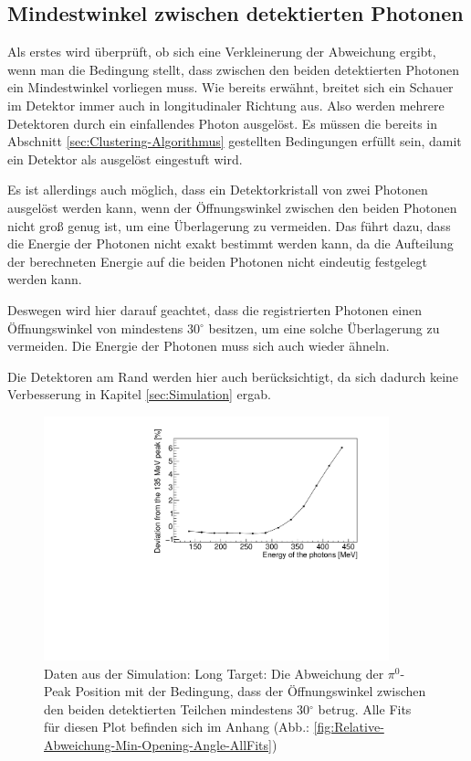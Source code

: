 \documentclass[a4paper,11pt,oneside,final,german,openbib,pdftex]{scrbook}
\begin{document}
{\subsection{Mindestwinkel zwischen detektierten Photonen}
\label{sec:Min-Openingangle}

Als erstes wird \"uberpr\"uft, ob sich eine Verkleinerung der Abweichung ergibt, wenn man die Bedingung stellt, dass zwischen den beiden detektierten Photonen ein Mindestwinkel vorliegen muss. 
Wie bereits erw\"ahnt, breitet sich ein Schauer im Detektor immer auch in longitudinaler Richtung aus. Also werden mehrere Detektoren durch ein einfallendes Photon ausgel\"ost. 
Es m\"ussen die bereits in Abschnitt \ref{sec:Clustering-Algorithmus} gestellten Bedingungen erf\"ullt sein, damit ein Detektor als ausgel\"ost eingestuft wird.

Es ist allerdings auch m\"oglich, dass ein Detektorkristall von zwei Photonen ausgel\"ost werden kann, wenn der \"Offnungswinkel zwischen den beiden Photonen nicht gro{\ss} genug ist, um eine \"Uberlagerung zu vermeiden. Das f\"uhrt dazu, dass die Energie der Photonen nicht exakt bestimmt werden kann, da die Aufteilung der berechneten Energie auf die beiden Photonen nicht eindeutig festgelegt werden kann.

Deswegen wird hier darauf geachtet, dass die registrierten Photonen einen \"Offnungswinkel von mindestens 30$^{\circ}$ besitzen, um eine solche \"Uberlagerung zu vermeiden.
Die Energie der Photonen muss sich auch wieder \"ahneln.

Die Detektoren am Rand werden hier auch ber\"ucksichtigt, da sich dadurch keine Verbesserung in Kapitel \ref{sec:Simulation} ergab.

\begin{figure}[h!]
	\begin{center}
		\includegraphics[width=100mm]{20172804MinOpeningAngleDeviation}
		\caption[Simulation: Symmetrische Photonen; Mindestwinkel zwischen detektierten Photonen]{Daten aus der Simulation: Long Target: Die Abweichung der $\pi^0$-Peak Position mit der Bedingung, dass der \"Offnungswinkel zwischen den beiden detektierten Teilchen mindestens 30$^{\circ}$ betrug. Alle Fits f\"ur diesen Plot befinden sich im Anhang (Abb.: \ref{fig:Relative-Abweichung-Min-Opening-Angle-AllFits})}
		\label{fig:Relative-Abweichung-Min-Opening-Angle}
	\end{center}
\end{figure}

}
\end{document}
